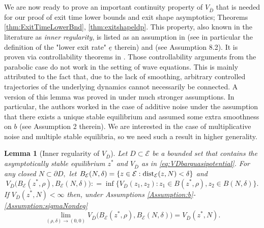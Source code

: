 \documentclass[10pt, reqno]{amsart}
\newcommand{\e}{\mathcal{E}}
\newtheorem{lem}{Lemma}
\theoremstyle{definition}
\numberwithin{lem}{section}
\numberwithin{cor}{section}
\numberwithin{prop}{section}
\numberwithin{thm}{section}
\numberwithin{dfn}{section}
\begin{document}
We are now ready to prove an important continuity property of $V_{\bar{D}}$ that is needed for our proof of exit time lower bounds and exit shape asymptotics; Theorems \ref{thm:ExitTimeLowerBnd}, \ref{thm:exitshapeldp}. This property, also known in the literature as \textit{inner regularity}, is listed as an assumption in \cite[Section 12.5.1]{da2014stochastic} (see in particular the definition of the "lower exit rate" $\underline{e}$ therein) and \cite{salins2019uniform} (see Assumption 8.2). It is proven via controllability theorems in \cite[Section 5.4; see also Theorem 5.7]{salins2021metastability}. Those controllability arguments from the parabolic case do not work in the setting of wave equations. This is mainly attributed to the fact that, due to the lack of smoothing, arbitrary controlled trajectories of the underlying dynamics cannot necessarily be connected. A version of this lemma was proved in \cite[Section 6]{cerrai2016smoluchowski} under much stronger assumptions. In particular, the authors worked in the case of additive noise under the assumption that there exists a unique stable equilibrium and assumed some extra smoothness on $b$ (see Assumption 2 therein). We are interested in the case of multiplicative noise and multiple stable equilibria, so we need such a result in higher generality.

\begin{lem}[Inner regularity of $V_{\bar{D}}$]\label{lem:innerregularity} Let $D\subset\e$ be a bounded set that contains the asymptotically stable equilibrium $z^*$ and $V_{\bar{D}}$ as in \eqref{eq:VDbarquasipotential}. For any closed $N \subset \partial D,$ let $B_\e(N, \delta)=\{ z\in\e: \textnormal{dist}_\e (z, N)<\delta\}$
    and 
    \begin{equation*}
        V_{\bar{D}}\big(B_\e(z^*,\rho), B_\e(N,\delta)\big): = \inf\bigg\{V_{\bar{D}}(z_1,z_2): z_1 \in B(z^*,\rho), z_2 \in B(N,\delta) \bigg\}.
    \end{equation*}
    If $V_{\bar{D}}(z^*, N)<\infty$ then, under Assumptions \ref{Assumption:b}- \ref{Assumption:sigmaNondeg}
    \begin{equation*}\label{eq:innerregularity}
        \lim_{(\rho, \delta)\rightarrow (0,0)} V_{\bar{D}}\big(B_\e(z^*,\rho), B_\e(N,\delta)\big) = V_{\bar{D}}(z^*,N).
    \end{equation*}
\end{lem}
\end{document}
